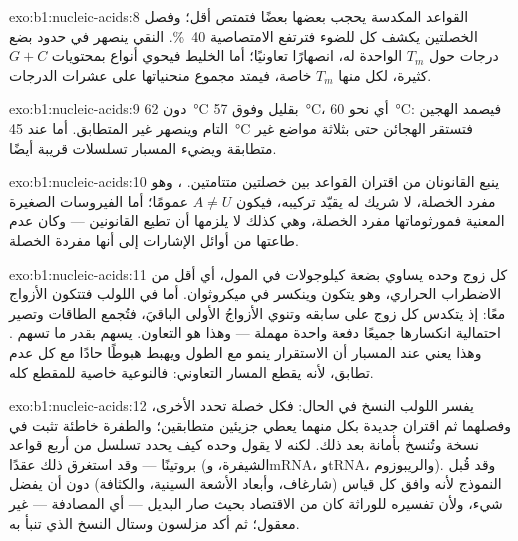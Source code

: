 \begin{solution}{exo:b1:nucleic-acids:8}
القواعد المكدسة يحجب بعضها بعضًا فتمتص أقل؛ وفصل الخصلتين يكشف كل
 للضوء فترتفع الامتصاصية \qty{40}{\%}.  النقي ينصهر في حدود
بضع درجات حول $T_m$ الواحدة له، انصهارًا تعاونيًا؛ أما الخليط فيحوي
أنواع  بمحتويات $G + C$ كثيرة، لكل منها $T_m$ خاصة، فيمتد مجموع
منحنياتها على عشرات الدرجات.
\end{solution}

\begin{solution}{exo:b1:nucleic-acids:9}
دون \qty{62}{\celsius} بقليل وفوق \qty{57}{\celsius}، أي نحو
\qty{60}{\celsius}: فيصمد الهجين التام وينصهر غير المتطابق. أما عند
\qty{45}{\celsius} فتستقر الهجائن حتى بثلاثة مواضع غير متطابقة ويضيء
المسبار تسلسلات قريبة أيضًا.
\end{solution}

\begin{solution}{exo:b1:nucleic-acids:10}
ينبع القانونان من اقتران القواعد بين خصلتين متتامتين. ، وهو مفرد
الخصلة، لا شريك له يقيّد تركيبه، فيكون $A \neq U$ عمومًا؛ أما
الفيروسات الصغيرة المعنية فمورثوماتها  مفرد الخصلة، وهي كذلك لا
يلزمها أن تطيع القانونين --- وكان عدم طاعتها من أوائل الإشارات إلى
أنها مفردة الخصلة.
\end{solution}

\begin{solution}{exo:b1:nucleic-acids:11}
كل زوج وحده يساوي بضعة كيلوجولات في المول، أي أقل من الاضطراب
الحراري، وهو يتكون وينكسر في ميكروثوان. أما في اللولب فتتكون الأزواج
معًا: إذ يتكدس كل زوج على سابقه وتنوي الأزواجُ الأولى الباقيَ، فتُجمع
الطاقات وتصير احتمالية انكسارها جميعًا دفعة واحدة مهملة --- وهذا هو
التعاون.  يسهم بقدر ما تسهم . وهذا يعني
عند المسبار أن الاستقرار ينمو مع الطول ويهبط هبوطًا حادًا مع كل عدم
تطابق، لأنه يقطع المسار التعاوني: فالنوعية خاصية للمقطع كله.
\end{solution}

\begin{solution}{exo:b1:nucleic-acids:12}
يفسر اللولب النسخ في الحال: فكل خصلة تحدد الأخرى، وفصلهما ثم اقتران
 جديدة بكل منهما يعطي جزيئين متطابقين؛ والطفرة  خاطئة
تثبت في نسخة وتُنسخ بأمانة بعد ذلك. لكنه لا يقول وحده كيف يحدد تسلسل
من أربع قواعد بروتينًا --- وقد استغرق ذلك عقدًا (الشيفرة، وmRNA،
وtRNA، والريبوزوم). وقد قُبل النموذج لأنه وافق كل قياس (شارغاف،
وأبعاد الأشعة السينية، والكثافة) دون أن يفضل شيء، ولأن تفسيره للوراثة
كان من الاقتصاد بحيث صار البديل --- أي المصادفة --- غير معقول؛ ثم
أكد مزلسون وستال النسخ الذي تنبأ به.
\end{solution}

